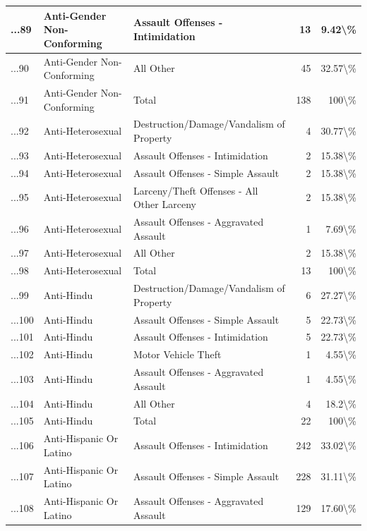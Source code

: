 \documentclass[
]{krantz}
\begin{document}
\begin{longtable}[t]{l|l|l|r|r}
\hline
...89 & Anti-Gender Non-Conforming & Assault Offenses - Intimidation & 13 & 9.42\textbackslash{}\%\\
\hline
...90 & Anti-Gender Non-Conforming & All Other & 45 & 32.57\textbackslash{}\%\\
\hline
...91 & Anti-Gender Non-Conforming & Total & 138 & 100\textbackslash{}\%\\
\hline
...92 & Anti-Heterosexual & Destruction/Damage/Vandalism of Property & 4 & 30.77\textbackslash{}\%\\
\hline
...93 & Anti-Heterosexual & Assault Offenses - Intimidation & 2 & 15.38\textbackslash{}\%\\
\hline
...94 & Anti-Heterosexual & Assault Offenses - Simple Assault & 2 & 15.38\textbackslash{}\%\\
\hline
...95 & Anti-Heterosexual & Larceny/Theft Offenses - All Other Larceny & 2 & 15.38\textbackslash{}\%\\
\hline
...96 & Anti-Heterosexual & Assault Offenses - Aggravated Assault & 1 & 7.69\textbackslash{}\%\\
\hline
...97 & Anti-Heterosexual & All Other & 2 & 15.38\textbackslash{}\%\\
\hline
...98 & Anti-Heterosexual & Total & 13 & 100\textbackslash{}\%\\
\hline
...99 & Anti-Hindu & Destruction/Damage/Vandalism of Property & 6 & 27.27\textbackslash{}\%\\
\hline
...100 & Anti-Hindu & Assault Offenses - Simple Assault & 5 & 22.73\textbackslash{}\%\\
\hline
...101 & Anti-Hindu & Assault Offenses - Intimidation & 5 & 22.73\textbackslash{}\%\\
\hline
...102 & Anti-Hindu & Motor Vehicle Theft & 1 & 4.55\textbackslash{}\%\\
\hline
...103 & Anti-Hindu & Assault Offenses - Aggravated Assault & 1 & 4.55\textbackslash{}\%\\
\hline
...104 & Anti-Hindu & All Other & 4 & 18.2\textbackslash{}\%\\
\hline
...105 & Anti-Hindu & Total & 22 & 100\textbackslash{}\%\\
\hline
...106 & Anti-Hispanic Or Latino & Assault Offenses - Intimidation & 242 & 33.02\textbackslash{}\%\\
\hline
...107 & Anti-Hispanic Or Latino & Assault Offenses - Simple Assault & 228 & 31.11\textbackslash{}\%\\
\hline
...108 & Anti-Hispanic Or Latino & Assault Offenses - Aggravated Assault & 129 & 17.60\textbackslash{}\%\\

\end{longtable}
\end{document}
